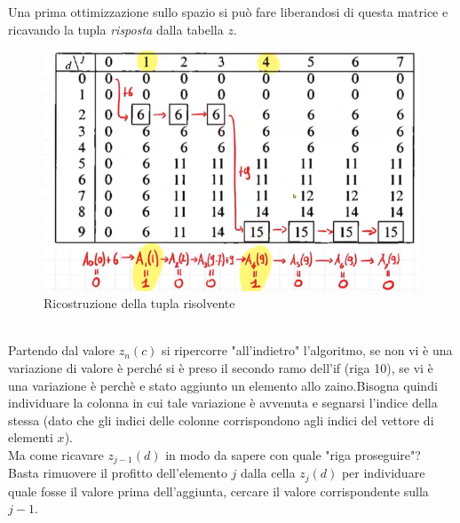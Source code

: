 \documentclass[a4paper]{article}
\begin{document}
Una prima ottimizzazione sullo spazio si può fare liberandosi di questa matrice e ricavando la tupla \textit{risposta} dalla tabella $z$.\\
\begin{figure}[!ht]
\centering
\includegraphics[width=1\textwidth]{./img/D2_ricavo}
\caption{Ricostruzione della tupla risolvente} \label{FIG:D2_ricavo}
\end{figure}\\
Partendo dal valore $z_n(c)$ si ripercorre "all'indietro" l'algoritmo, se non vi è una variazione di valore è perché si è preso il secondo ramo dell'if (riga 10), se vi è una variazione è perchè e stato aggiunto un elemento allo zaino.Bisogna quindi individuare la colonna in cui tale variazione è avvenuta e segnarsi l'indice della stessa (dato che gli indici delle colonne corrispondono agli indici del vettore di elementi $x$).\\
Ma come ricavare $z_{j-1}(d)$ in modo da sapere con quale "riga proseguire"? Basta rimuovere il profitto dell'elemento $j$ dalla cella $z_{j}(d)$ per individuare quale fosse il valore prima dell'aggiunta, cercare il valore corrispondente sulla $j-1$.
\end{document}
